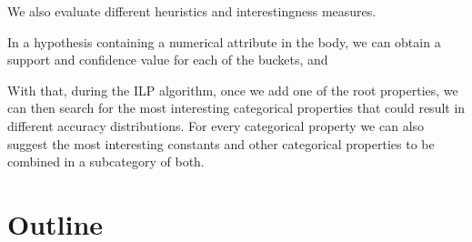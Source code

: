 We also evaluate different heuristics and interestingness measures.

In a hypothesis containing a numerical attribute in the body, we can obtain a support and confidence value for each of the buckets, and 

With that, during the ILP algorithm, once we add one of the root properties, we can then search for the most interesting categorical properties that could result in different accuracy distributions. For every categorical property we can also suggest the most interesting constants and other categorical properties to be combined in a subcategory of both.

\section{Outline}

\begin{comment}
 The remainder of this thesis is structured as follows. In
Chapter~\ref{ch:technical_background}, we provide technical background on
MapReduce and BigTable. In Chapter~\ref{ch:related_work}, we present a
summary of previous work in the areas of duplicate and near-duplicate detection,
information retrieval on web archives, and MapReduce applications in graph
processing. Following that, we state our problem and describe solutions in
Chapter~\ref{ch:redundancy_control}. In Chapter~\ref{ch:mapreduce_impl}, we
describe an implementation of our solution using the MapReduce framework. In
Chapter~\ref{ch:experiments}, we present our experimental results. We conclude
this thesis and outline directions of future research in Chapter~\ref{ch:future_work}.
\end{comment}
